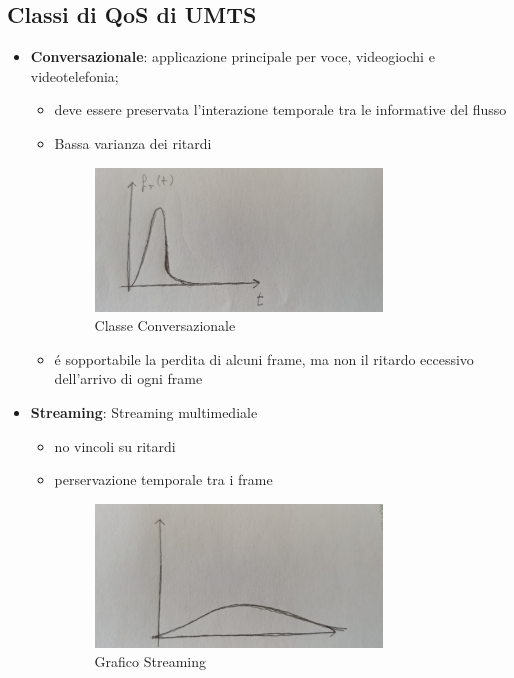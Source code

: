\documentclass{article}
\begin{document}
\begin{samepage}
    \subsection{Classi di QoS di UMTS}
    \begin{itemize}
        \item \textbf{Conversazionale}: applicazione principale per voce, videogiochi e videotelefonia;
            \begin{itemize}
                \item deve essere preservata l'interazione temporale tra le informative del flusso
                \item Bassa varianza dei ritardi

                    \begin{figure}[h]
                        \centering
                        \includegraphics[width=3in]{img/classe_conversazionale_grafico.jpg}
                        \caption{Classe Conversazionale}
                    \end{figure}
                \item \'e sopportabile la perdita di alcuni frame, ma non il ritardo eccessivo dell'arrivo di ogni frame

            \end{itemize}

        \item \textbf{Streaming}: Streaming multimediale
            \begin{itemize}
                \item no vincoli su ritardi
                \item perservazione temporale tra i frame

                    \begin{figure}[h]
                        \centering
                        \includegraphics[width=3in]{img/streaming_grafico.jpg}
                        \caption{Grafico Streaming}
                    \end{figure}
            \end{itemize}


\end{itemize}
\end{samepage}
\end{document}
